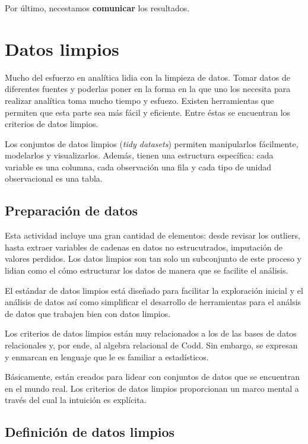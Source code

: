\documentclass[]{article}
\begin{document}
Por último, necestamos \textbf{comunicar} los resultados.

\section{Datos limpios}\label{datos-limpios}

Mucho del esfuerzo en analítica lidia con la limpieza de datos. Tomar
datos de diferentes fuentes y poderlas poner en la forma en la que uno
los necesita para realizar analítica toma mucho tiempo y esfuezo.
Existen herramientas que permiten que esta parte sea más fácil y
eficiente. Entre éstas se encuentran los criterios de datos limpios.

Los conjuntos de datos limpios (\emph{tidy datasets}) permiten
manipularlos fácilmente, modelarlos y visualizarlos. Además, tienen una
estructura específica: cada variable es una columna, cada observación
una fila y cada tipo de unidad observacional es una tabla.

\subsection{Preparación de datos}\label{preparacion-de-datos}

Esta actividad incluye una gran cantidad de elementos: desde revisar los
outliers, hasta extraer variables de cadenas en datos no estrucutrados,
imputación de valores perdidos. Los datos limpios son tan solo un
subconjunto de este proceso y lidian como el cómo estructurar los datos
de manera que se facilite el análisis.

El estándar de datos limpios está diseñado para facilitar la exploración
inicial y el análisis de datos así como simplificar el desarrollo de
herramientas para el análsis de datos que trabajen bien con datos
limpios.

Los criterios de datos limpios están muy relacionados a los de las bases
de datos relacionales y, por ende, al algebra relacional de Codd. Sin
embargo, se expresan y enmarcan en lenguaje que le es familiar a
estadísticos.

Básicamente, están creados para lidear con conjuntos de datos que se
encuentran en el mundo real. Los criterios de datos limpios proporcionan
un marco mental a través del cual la intuición es explícita.

\subsection{Definición de datos
limpios}\label{definicion-de-datos-limpios}
\end{document}
